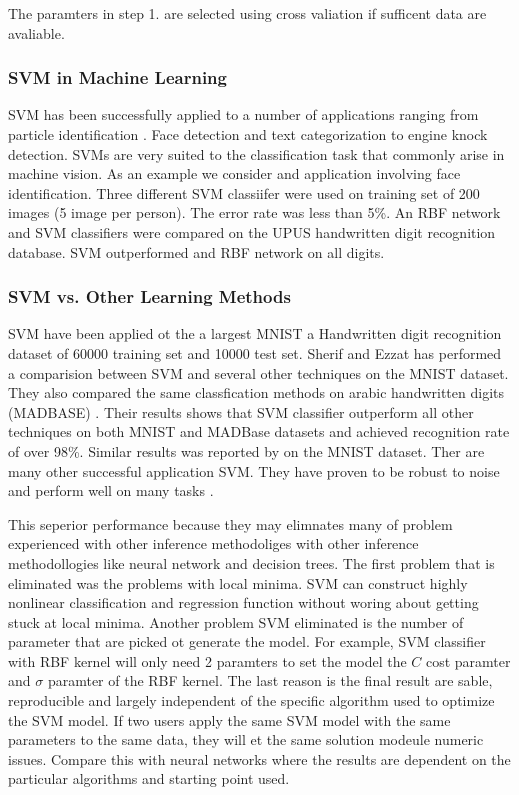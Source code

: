 The paramters in step 1. are selected using cross valiation if sufficent data are avaliable. %

\subsubsection{ SVM in Machine Learning }
SVM has been successfully applied to a number of applications ranging from particle identification \cite{ParticleSVM7}. Face detection  \cite{faceSVM8,faceSVM7} and text categorization \cite{TextSVM7} to engine knock detection. SVMs are very suited to the classification task that commonly arise in machine vision. As an example we consider and application involving face identification\cite{faceSVM8}.  Three different SVM classiifer were used on training set of 200 images (5 image per person). The error rate was less than 5\%. An RBF network and SVM classifiers were compared on the UPUS handwritten digit recognition database\cite{ORLDataset}.  SVM outperformed and RBF network on all digits.  

\subsubsection {SVM vs. Other Learning Methods}

SVM have been applied ot the a largest MNIST a Handwritten digit recognition dataset of 60000 training set and 10000 test set\cite{IjdarSherifPaper}. Sherif and Ezzat has performed a comparision between SVM and several other techniques on the MNIST dataset. They also compared the same classfication methods on arabic handwritten digits (MADBASE) \cite{ADBase9,IjdarSherifPaper}. Their results shows that SVM classifier outperform all other techniques on both MNIST and MADBase datasets and achieved recognition rate of over 98\%. Similar results was reported by \cite{empiricalcomp11,SVMInvariantComDecoste02} on the MNIST dataset. Ther are many other successful application SVM. They have proven to be robust to noise and perform well on many tasks \cite{empiricalcomp11,Scholkopf97comparingsupport}. 


This seperior performance because they may elimnates many of problem experienced with other inference methodoliges with other inference methodollogies like neural network and decision trees. The first problem that is eliminated was the problems with local minima. SVM can construct highly nonlinear classification and regression function without woring about getting stuck at local minima. Another problem SVM eliminated is the number of parameter that are picked ot generate the model. For example, SVM classifier with RBF  kernel will only need 2 paramters to set the model the $C$ cost paramter and $\sigma$ paramter of the RBF kernel. The last reason is the final result are sable, reproducible and largely independent of the specific algorithm used to  optimize the SVM model. If two users apply the same SVM model with the same parameters to the same data, they will et the same solution modeule numeric issues. Compare this with neural networks where the results are dependent on the particular algorithms and starting point used. 

